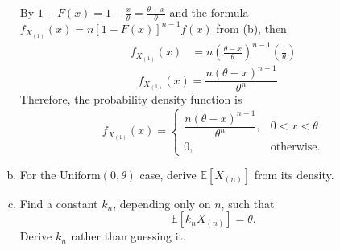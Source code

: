\documentclass[letterpaper,12pt]{article}
\begin{document}
\begin{enumerate}[(a)]
\begin{list}{}{}
        By $1 - F(x) = 1 - \frac{x}{\theta} = \frac{\theta - x}{\theta}$ and the formula $f_{X_{(1)}}(x) = n [1 - F(x)]^{n-1} f(x)$ from (b), then
        \begin{align*}
        f_{X_{(1)}}^{}(x) &= n \left( \frac{\theta - x}{\theta} \right)^{n-1} \left( \frac{1}{\theta} \right)  
        \end{align*}
        \[  \boxed{f_{X_{(1)}}^{}(x) = \frac{n (\theta - x)^{n-1}}{\theta^n} \quad}\]
        Therefore,  the probability density function is
        \[        f_{X_{(1)}}(x) = \begin{cases} \dfrac{n (\theta - x)^{n-1}}{\theta^n}, & 0 < x < \theta \\[1em] 0, & \text{otherwise}. \end{cases}
        \]
    \end{list}
    \item For the $\text{Uniform}(0, \theta)$ case, derive $\mathbb{E}[X_{(n)}]$ from its density.
    \vspace{0.5em}
    \item Find a constant $k_n$, depending only on $n$, such that
    \[    \mathbb{E}[k_n X_{(n)}] = \theta.    \]
    Derive $k_n$ rather than guessing it.
    \vspace{0.5em}
\end{enumerate}
\end{document}
